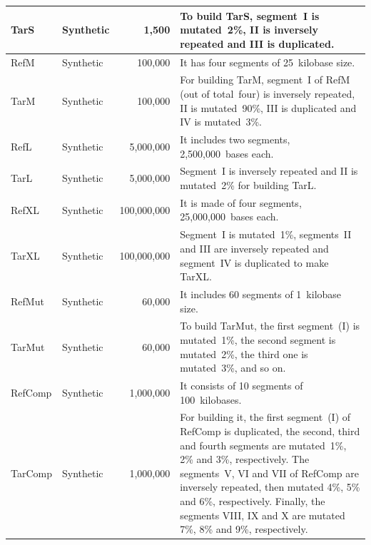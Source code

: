 \documentclass[a4paper,num-refs]{oup-contemporary}
\begin{document}
\begin{table}[h]
\begin{tabularx}{\linewidth}{llrX}
    TarS & Synthetic & 1,500 & To build TarS, segment~I is mutated~2\%, II is inversely repeated and III is duplicated. \\
    \midrule
    RefM & Synthetic & 100,000 & It has four segments of 25~kilobase size. \\
    TarM & Synthetic & 100,000 & For building TarM, segment~I of RefM (out of total~four) is inversely repeated, II is mutated~90\%, III is duplicated and IV is mutated~3\%. \\
    \midrule
    RefL & Synthetic & 5,000,000 & It includes two segments, 2,500,000~bases each. \\
    TarL & Synthetic & 5,000,000 & Segment~I is inversely repeated and II is mutated~2\% for building TarL. \\
    \midrule
    RefXL & Synthetic & 100,000,000 & It is made of four segments, 25,000,000~bases each. \\
    TarXL & Synthetic & 100,000,000 & Segment~I is mutated~1\%, segments~II and III are inversely repeated and segment~IV is duplicated to make TarXL. \\
    \midrule
    RefMut & Synthetic & 60,000 & It includes 60 segments of 1~kilobase size. \\
    TarMut & Synthetic & 60,000 & To build TarMut, the first segment~(I) is mutated~1\%, the second segment is mutated~2\%, the third one is mutated~3\%, and so on. \\
    \midrule
    RefComp & Synthetic & 1,000,000 & It consists of 10 segments of 100~kilobases. \\
    TarComp & Synthetic & 1,000,000 & For building it, the first segment~(I) of RefComp is duplicated, the second, third and fourth segments are mutated~1\%, 2\% and 3\%, respectively. The segments~V, VI and VII of RefComp are inversely repeated, then mutated 4\%, 5\% and 6\%, respectively. Finally, the segments VIII, IX and X are mutated 7\%, 8\% and 9\%, respectively. \\
    \bottomrule
  \end{tabularx}

\end{table}
\end{document}
